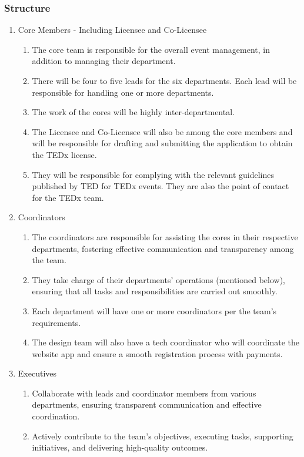\documentclass[12pt]{article}
\begin{document}
\subsubsection{Structure}
\begin{enumerate}
    \item Core Members - Including Licensee and Co-Licensee
    \begin{enumerate}
        \item The core team is responsible for the overall event management, in addition to managing their department.
        \item There will be four to five leads for the six departments. Each lead will be responsible for handling one or more departments.
        \item The work of the cores will be highly inter-departmental.
        \item The Licensee and Co-Licensee will also be among the core members and will be responsible for drafting and submitting the application to obtain the TEDx license.
        \item They will be responsible for complying with the relevant guidelines published by TED for TEDx events. They are also the point of contact for the TEDx team.
    \end{enumerate}
    \item Coordinators
    \begin{enumerate}
        \item The coordinators are responsible for assisting the cores in their respective departments, fostering effective communication and transparency among the team.
        \item They take charge of their departments' operations (mentioned below), ensuring that all tasks and responsibilities are carried out smoothly.
        \item Each department will have one or more coordinators per the team's requirements.
        \item The design team will also have a tech coordinator who will coordinate the website app and ensure a smooth registration process with payments.
    \end{enumerate}
    \item Executives
    \begin{enumerate}
        \item Collaborate with leads and coordinator members from various departments, ensuring transparent communication and effective coordination.
        \item Actively contribute to the team's objectives, executing tasks, supporting initiatives, and delivering high-quality outcomes.
    \end{enumerate}
\end{enumerate}
\end{document}

